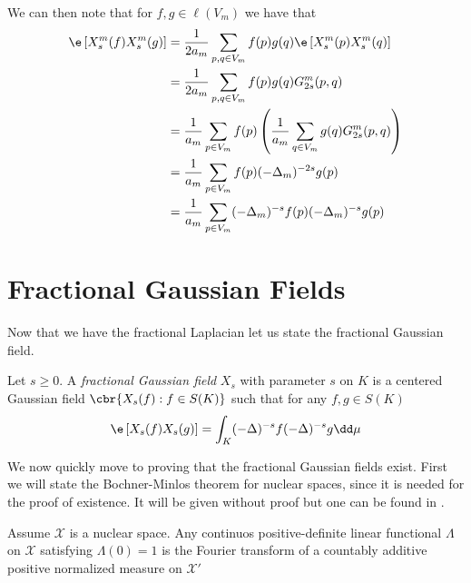 We can then note that for $f,g \in \ell(V_m)$ we have that
\begin{align}
	\e \left[X_s^{m}(f)X_s^{m}(g)\right] &= \frac{1}{2a_m} \sum_{p,q \in V_m}f(p)g(q)\e\left[X_s^{m}(p)X_s^{m}(q)\right] \\
	&=  \frac{1}{2a_m} \sum_{p,q \in V_m}f(p)g(q)G_{2s}^{m}(p,q) \\
	&= \frac{1}{a_m} \sum_{p \in V_m}f(p)\left(\frac{1}{a_m} \sum_{q \in V_m}g(q)G_{2s}^{m}(p,q)\right) \\
	& = \frac{1}{a_m} \sum_{p \in V_m}f(p)(-\Delta_{m})^{-2s}g(p) \\
	& = \frac{1}{a_m} \sum_{p \in V_m} (-\Delta_{m})^{-s}f(p)(-\Delta_{m})^{-s}g(p)
\end{align}

\section{Fractional Gaussian Fields}
Now that we have the fractional Laplacian let us state the fractional Gaussian field.

\begin{defi}\label{fracGaussianField}
	Let $s \geq 0$. A \emph{fractional Gaussian field} $X_s$ with parameter $s$ on $K$ is a centered Gaussian field $\cbr{X_s(f): f \in S(K)}$ such that for any $f,g \in S(K)$
	\begin{equation}
		\e \left[X_s(f) X_s(g)\right] = \int_{K} (-\Delta)^{-s}f (-\Delta)^{-s}g \dd \mu
	\end{equation}
\end{defi}

We now quickly move to proving that the fractional Gaussian fields exist. First we will state the Bochner-Minlos theorem for nuclear spaces, since it is needed for the proof of existence. It will be given without proof but one can be found in \cite{minlos}.

\begin{theorem}\label{BochnerMinlos}
	Assume $\mathcal{X}$ is a nuclear space. Any continuos positive-definite linear functional $\Lambda$ on $\mathcal{X}$ satisfying $\Lambda(0) = 1$ is the Fourier transform of a countably additive positive normalized measure on $\mathcal{X}'$
\end{theorem}

